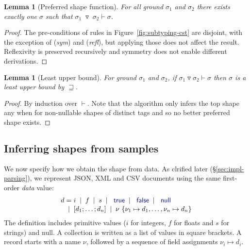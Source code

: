 \documentclass[10pt,preprint,clearpagebib]{sigplanconf}
\newcommand{\kvd}[1]{\textnormal{\textcolor{kvdclr}{\sffamily #1}}}
\newcommand{\lsep}[0]{\;\; | \;\;}
\newcommand{\narrow}[1]{\hspace{-0.7em} #1 \hspace{-0.7em}}
\newcommand{\tsep}[0]{\; \triangledown \;}
\newtheorem{lemma}[theorem]{Lemma}
\begin{document}
\begin{lemma}[Preferred shape function]
\label{thm:func}
For all ground $\sigma_1$ and $\sigma_2$ there exists exactly one $\sigma$ such that 
$\sigma_1 \tsep \sigma_2 \vdash \sigma$. 
\end{lemma}
\begin{proof}
The pre-conditions of rules in Figure~\ref{fig:subtyping-cst} are disjoint, with the exception 
of (\emph{sym}) and (\emph{refl}), but applying those does not affect the result. Reflexivity is
preserved recursively and symmetry does not enable different derivations.
\end{proof}

\begin{lemma}[Least upper bound]
\label{thm:lub}
For ground $\sigma_1$ and $\sigma_2$, if $\sigma_1 \triangledown \sigma_2 \vdash \sigma$ then $\sigma$ is a least upper bound by $\sqsupseteq$.
\end{lemma}
\begin{proof}
By induction over $\vdash$. Note that the algorithm only infers the top shape \kvd{any} when for non-nullable
shapes of distinct tags and so no better preferred shape exists.
\end{proof}

\subsection{Inferring shapes from samples}
\label{sec:formal-inferval}

We now specify how we obtain the shape from data. As clrified later (\S\ref{sec:impl-parsing}), 
we represent JSON, XML and CSV documents using the same first-order \emph{data} value:
%
\begin{equation*}
\begin{array}{lcl}
 d &\narrow{=}& i \lsep f \lsep s \lsep \kvd{true} \lsep \kvd{false} \lsep \kvd{null} \\[0.1em]
   &\narrow{|}& [d_1; \ldots; d_n] \lsep \nu~\{ \nu_1 \mapsto d_1, \ldots, \nu_n \mapsto d_n \}
\end{array}
\end{equation*}
%
The definition includes primitive values ($i$ for integers, $f$ for floats
and $s$ for strings) and \kvd{null}. A collection is written as a 
list of values in square brackets. A record starts with a name $\nu$, followed by a 
sequence of field assignments $\nu_i \mapsto d_i$.
\end{document}
